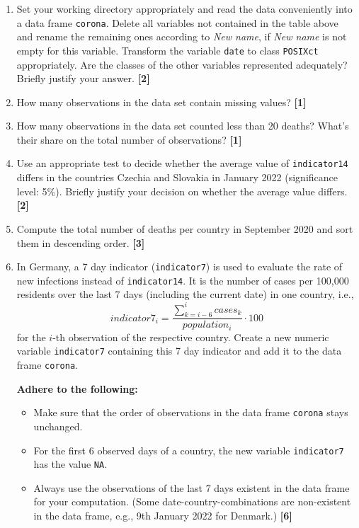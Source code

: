 \documentclass[a4paper,11pt]{article}
\begin{document}
\begin{enumerate}[label=\alph*)]
    \item Set your working directory appropriately and read the data conveniently into a data frame \texttt{corona}. Delete all variables not contained in the table above and rename the remaining ones according to \textit{New name}, if \textit{New name} is not empty for this variable. Transform the variable \texttt{date} to class \texttt{POSIXct} appropriately. Are the classes of the other variables represented adequately? Briefly justify your answer. \textbf{[2]}
    
    \item How many observations in the data set contain missing values? \textbf{[1]}
    
    \item How many observations in the data set counted less than 20 deaths? What's their share on the total number of observations? \textbf{[1]}
    
    \item Use an appropriate test to decide whether the average value of \texttt{indicator14} differs in the countries Czechia and Slovakia in January 2022 (significance level: 5\%). Briefly justify your decision on whether the average value differs. \textbf{[2]}
    
    \item Compute the total number of deaths per country in September 2020 and sort them in descending order. \textbf{[3]}
    
    \item In Germany, a 7 day indicator (\texttt{indicator7}) is used to evaluate the rate of new infections instead of \texttt{indicator14}. It is the number of cases per 100,000 residents over the last 7 days (including the current date) in one country, i.e.,
    \[
    indicator7_{i} = \frac{\sum_{k=i-6}^{i} cases_{k}}{population_{i}} \cdot 100
    \]
    for the $i$-th observation of the respective country. Create a new numeric variable \texttt{indicator7} containing this 7 day indicator and add it to the data frame \texttt{corona}. 
    
    \textbf{Adhere to the following:}
    \begin{itemize}
        \item Make sure that the order of observations in the data frame \texttt{corona} stays unchanged.
        \item For the first 6 observed days of a country, the new variable \texttt{indicator7} has the value \texttt{NA}.
        \item Always use the observations of the last 7 days existent in the data frame for your computation. (Some date-country-combinations are non-existent in the data frame, e.g., 9th January 2022 for Denmark.) \textbf{[6]}
    \end{itemize}
    

\end{enumerate}
\end{document}
